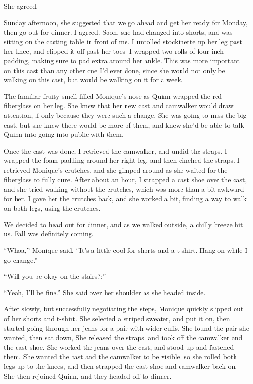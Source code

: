 She agreed.

Sunday afternoon, she suggested that we go ahead and get her ready for Monday, then go out
for dinner. I agreed. Soon, she had changed into shorts, and was sitting on the casting table in
front of me. I unrolled stockinette up her leg past her knee, and clipped it off past her toes.
I wrapped two rolls of four inch padding, making sure to pad extra around her ankle. This was
more important on this cast than any other one I'd ever done, since she would not only be
walking on this cast, but would be walking on it for a week.

\begin{thought}
The familiar fruity smell filled Monique's nose as Quinn wrapped the red fiberglass on her
leg. She knew that her new cast and camwalker would draw attention, if only because they were
such a change. She was going to miss the big cast, but she knew there would be more of them, and
knew she'd be able to talk Quinn into going into public with them.
\end{thought}

Once the cast was done, I retrieved the camwalker, and undid the straps. I wrapped the foam
padding around her right leg, and then cinched the straps. I retrieved Monique's crutches, and
she gimped around as she waited for the fiberglass to fully cure. After about an hour, I
strapped a cast shoe over the cast, and she tried walking without the crutches, which was more
than a bit awkward for her. I gave her the crutches back, and she worked a bit, finding a way to
walk on both legs, using the crutches.

We decided to head out for dinner, and as we walked outside, a chilly breeze hit us. Fall
was definitely coming.

``Whoa,'' Monique said. ``It's a little cool for shorts and a t-shirt. Hang on while I go
change.''

``Will you be okay on the stairs?:''

``Yeah, I'll be fine.'' She said over her shoulder as she headed inside.

\begin{thought}
After slowly, but successfully negotiating the steps, Monique quickly slipped out of her
shorts and t-shirt. She selected a striped sweater, and put it on, then started going through
her jeans for a pair with wider cuffs. She found the pair she wanted, then sat down, She
released the straps, and took off the camwalker and the cast shoe. She worked the jeans over the
cast, and stood up and fastened them. She wanted the cast and the camwalker to be visible, so
she rolled both legs up to the knees, and then strapped the cast shoe and camwalker back on. She
then rejoined Quinn, and they headed off to dinner.
\end{thought}

